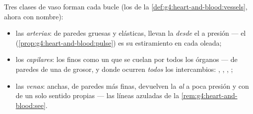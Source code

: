 \begin{definition}\label{def:g7:heart-and-circulation:vessels}
Tres clases de vaso forman cada bucle (los de la
\cref{def:g4:heart-and-blood:vessels}, ahora con nombre):
\begin{itemize}
  \item las \emph{arterias}: de paredes gruesas y
        elásticas, llevan la  \emph{desde} el  a presión
        --- el  (\cref{prop:g4:heart-and-blood:pulse}) es su
        estiramiento en cada oleada;
  \item los \emph{capilares}: los  finos como un
         que se cuelan por todos los órganos --- de paredes de una
         de grosor, y donde ocurren \emph{todos} los
        intercambios: , , , ;
  \item las \emph{venas}: anchas, de paredes más finas,
        devuelven la  \emph{al}  a poca presión y con
         de un solo sentido propias --- las líneas azuladas de
        la \cref{rem:g4:heart-and-blood:see}.
\end{itemize}
\end{definition}

